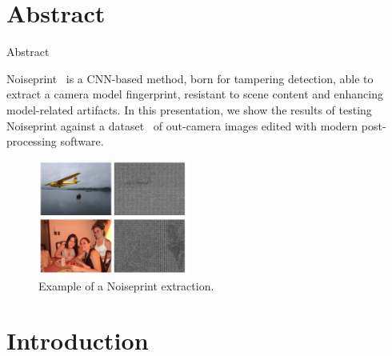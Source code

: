 \section{Abstract}

\begin{frame}{Abstract}
    
    Noiseprint~\cite{cozzolino2018noiseprint} is a CNN-based method, born for tampering detection, able to extract a camera model fingerprint, resistant to scene content and enhancing model-related artifacts. In this presentation, we show the results of testing Noiseprint against a dataset~\cite{montibeller} of out-camera images edited with modern post-processing software.
    
    \begin{figure}
        \centering
        \includegraphics[width=0.44\textwidth]{../drawable/examples/example-noiseprint.png}
        \caption{Example of a Noiseprint extraction.}
    \end{figure}
\end{frame}

\section{Introduction}

